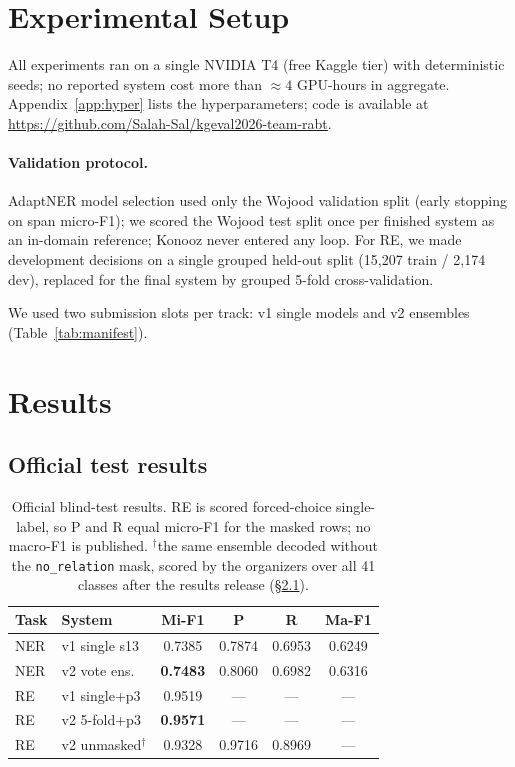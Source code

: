 \documentclass[11pt]{article}
\begin{document}
\section{Experimental Setup}

All experiments ran on a single NVIDIA T4 (free Kaggle tier) with
deterministic seeds; no reported system cost more than
${\approx}4$ GPU-hours in aggregate. Appendix~\ref{app:hyper} lists the
hyperparameters; code is available at
\url{https://github.com/Salah-Sal/kgeval2026-team-rabt}.

\paragraph{Validation protocol.} AdaptNER model selection used only the
Wojood validation split (early stopping on span micro-F1); we scored the
Wojood test split once per finished system as an in-domain reference;
Konooz never entered any loop. For RE, we made development decisions on a
single grouped held-out split (15,207 train / 2,174 dev), replaced for
the final system by grouped 5-fold cross-validation.

We used two submission slots per track: v1 single models and v2
ensembles (Table~\ref{tab:manifest}).

\section{Results}

\subsection{Official test results}
\label{sec:official}

\begin{table}[t]
\centering
\small
\setlength{\tabcolsep}{2pt}
\begin{tabular}{llcccc}
\toprule
\textbf{Task} & \textbf{System} & \textbf{Mi-F1} & \textbf{P} & \textbf{R} & \textbf{Ma-F1} \\
\midrule
NER & v1 single s13 & 0.7385 & 0.7874 & 0.6953 & 0.6249 \\
NER & v2 vote ens. & \textbf{0.7483} & 0.8060 & 0.6982 & 0.6316 \\
RE & v1 single+p3 & 0.9519 & --- & --- & --- \\
RE & v2 5-fold+p3 & \textbf{0.9571} & --- & --- & --- \\
RE & v2 unmasked$^{\dagger}$ & 0.9328 & 0.9716 & 0.8969 & --- \\
\bottomrule
\end{tabular}
\caption{Official blind-test results. RE is scored forced-choice
single-label, so P and R equal micro-F1 for the masked rows; no macro-F1
is published. $^{\dagger}$the same ensemble decoded without the
\texttt{no\_relation} mask, scored by the organizers over all 41 classes
after the results release (\S\ref{sec:official}).}
\label{tab:official}
\end{table}
\end{document}
